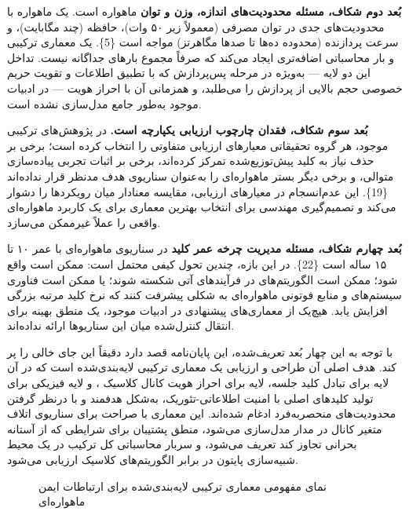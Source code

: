\documentclass[a4paper,14pt]{extreport}
\begin{document}
\textbf{بُعد دوم شکاف، مسئله محدودیت‌های اندازه، وزن و توان } ماهواره است. یک ماهواره  با محدودیت‌های جدی در توان مصرفی (معمولاً زیر ۵۰ وات)، حافظه (چند مگابایت)، و سرعت پردازنده (محدوده ده‌ها تا صدها مگاهرتز) مواجه است \{5\}. یک معماری ترکیبی  و  بار محاسباتی اضافه‌تری ایجاد می‌کند که صرفاً مجموع بارهای جداگانه نیست. تداخل این دو لایه --- به‌ویژه در مرحله پس‌پردازش  که با تطبیق اطلاعات  و تقویت حریم خصوصی  حجم بالایی از پردازش را می‌طلبد، و همزمانی آن با احراز هویت  --- در ادبیات موجود به‌طور جامع مدل‌سازی نشده است.

\textbf{بُعد سوم شکاف، فقدان چارچوب ارزیابی یکپارچه است.} در پژوهش‌های ترکیبی موجود، هر گروه تحقیقاتی معیارهای ارزیابی متفاوتی را انتخاب کرده است؛ برخی بر حذف نیاز به کلید پیش‌توزیع‌شده تمرکز کرده‌اند، برخی بر اثبات تجربی پیاده‌سازی متوالی، و برخی دیگر بستر ماهواره‌ای را به‌عنوان سناریوی هدف مدنظر قرار نداده‌اند \{19\}. این عدم‌انسجام در معیارهای ارزیابی، مقایسه معنادار میان رویکردها را دشوار می‌کند و تصمیم‌گیری مهندسی برای انتخاب بهترین معماری برای یک کاربرد ماهواره‌ای واقعی را عملاً غیرممکن می‌سازد.

\textbf{بُعد چهارم شکاف، مسئله مدیریت چرخه عمر کلید } در سناریوی ماهواره‌ای با عمر ۱۰ تا ۱۵ ساله است \{22\}. در این بازه، چندین تحول کیفی محتمل است: ممکن است  واقع شود؛ ممکن است الگوریتم‌های  در فرآیندهای آتی شکسته شوند؛ یا ممکن است فناوری سیستم‌های  و منابع فوتونی ماهواره‌ای به شکلی پیشرفت کنند که نرخ کلید  مرتبه بزرگی افزایش یابد. هیچ‌یک از معماری‌های پیشنهادی در ادبیات موجود، یک منطق  بهینه برای انتقال کنترل‌شده میان این سناریوها ارائه نداده‌اند.

با توجه به این چهار بُعد تعریف‌شده، این پایان‌نامه قصد دارد دقیقاً این جای خالی را پر کند. هدف اصلی آن طراحی و ارزیابی یک معماری ترکیبی لایه‌بندی‌شده است که در آن لایه  برای تبادل کلید جلسه، لایه  برای احراز هویت کانال کلاسیک ، و لایه فیزیکی  برای تولید کلیدهای اصلی  با امنیت اطلاعاتی-تئوریک، به‌شکل هدفمند و با درنظر گرفتن محدودیت‌های منحصربه‌فرد  ادغام شده‌اند. این معماری با صراحت برای سناریوی اتلاف متغیر کانال  در مدار  مدل‌سازی می‌شود، منطق پشتیبان برای شرایطی که  از آستانه بحرانی تجاوز کند تعریف می‌شود، و سربار محاسباتی کل ترکیب در یک محیط شبیه‌سازی پایتون در برابر الگوریتم‌های کلاسیک ارزیابی می‌شود.

\begin{figure}[H]
\centering
{}
\caption{نمای مفهومی معماری ترکیبی لایه‌بندی‌شده  برای ارتباطات ایمن ماهواره‌ای}
\label{fig:2-6}
\end{figure}
\end{document}
